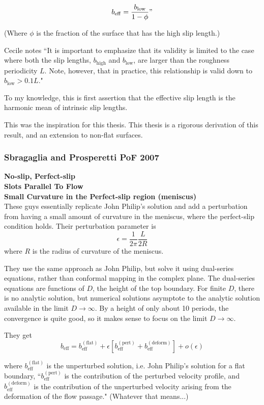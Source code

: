 \documentclass{article}
\begin{document}
\[ b_{\mathrm{eff}} = \frac{b_{\mathrm{low}}}{1-\phi} \mathrm{"}\] 

(Where $\phi$ is the fraction of the surface that has the high slip length.)

Cecile notes ``It is important to emphasize that its validity is limited to the case where both the slip lengths, $b_{\mathrm{high}}$ and $b_{\mathrm{low}}$, are larger than the roughness periodicity $L$.  Note, however, that in practice, this relationship is valid down to $b_{\mathrm{low}} > 0.1 L$."

To my knowledge, this is first assertion that the effective slip length is the harmonic mean of intrinsic slip lengths.

This was the inspiration for this thesis.  This thesis is a rigorous derivation of this result, and an extension to non-flat surfaces.

\subsubsection*{Sbragaglia and Prosperetti PoF 2007}

\textbf{No-slip, Perfect-slip}\\
\textbf{Slots Parallel To Flow}\\
\textbf{Small Curvature in the Perfect-slip region (meniscus)}\\

These guys essentially replicate John Philip's solution and add a perturbation from having a small amount of curvature in the meniscus, where the perfect-slip condition holds.  Their perturbation parameter is \[ \epsilon = \frac{1}{2\pi}\frac{L}{2R} \] where $R$ is the radius of curvature of the meniscus.


They use the same approach as John Philip, but solve it using dual-series equations, rather than conformal mapping in the complex plane.  The dual-series equations are functions of $D$, the height of the top boundary.  For finite $D$, there is no analytic solution, but numerical solutions asymptote to the analytic solution available in the limit $D \rightarrow \infty$.  By a height of only about 10 periods, the convergence is quite good, so it makes sense to focus on the limit $D \rightarrow \infty$.

They get
\[ b_{\mathrm{eff}} = b_{\mathrm{eff}}^{\mathrm{(flat)}} + \epsilon 
[ b_{\mathrm{eff}}^{\mathrm{(pert)}} + b_{\mathrm{eff}}^{\mathrm{(deform)}} ]
+ o(\epsilon) \]

where $ b_{\mathrm{eff}}^{\mathrm{(flat)}} $ is the unperturbed solution, i.e. John Philip's solution for a flat boundary, ``$ b_{\mathrm{eff}}^{\mathrm{(pert)}} $ is the contribution of the perturbed velocity profile, and $ b_{\mathrm{eff}}^{\mathrm{(deform)}} $ is the contribution of the unperturbed velocity arising from the deformation of the flow passage."
(Whatever that means...)
\end{document}
